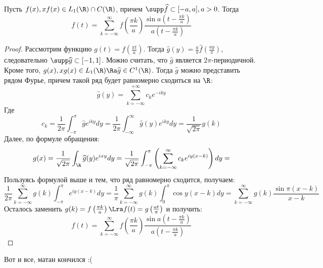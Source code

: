 \begin{theorem}[Котельникова]
    Пусть \(f(x), xf(x) \in L_1(\R) \cap C(\R)\), причем \(\supp \widehat{f} \subset [-a, a], a > 0\). Тогда
    \[f(t) = \sum_{k = -\infty}^{\infty} f\left( \frac{\pi k}{a} \right)\frac{\sin a\left( t - \frac{\pi k}{a} \right)}{a(t - \frac{\pi k}{a})}\]
\end{theorem}
\begin{proof}
    Рассмотрим функцию \(g(t) = f\left( \frac{\pi t}{a} \right)\). Тогда \(\widehat{g}(y) = \frac{a}{\pi}\widehat{f}\left( \frac{ay}{\pi} \right)\), следовательно \(\supp \widehat{g} \subset [-1, 1]\). Можно считать, что \(\widehat{g}\) является \(2\pi\)-периодичной. Кроме того, \(g(x), xg(x) \in L_1(\R) \Ra \widehat{g} \in C^1(\R)\). Тогда \(\widehat{g}\) можно представить рядом Фурье, причем такой ряд будет равномерно сходиться на \(\R\):
    \[\widehat{g}(y) = \sum_{k = -\infty}^{+\infty}c_ke^{-iky}\]
    Где
    \[c_k = \frac{1}{2\pi}\int_{-\pi}^{\pi}\widehat{g}e^{iky}dy = \frac{1}{2\pi}\int_{-\infty}^{\infty}\widehat{g}(y)e^{iky}dy = \frac{1}{\sqrt{2\pi}}g(k)\]
    Далее, по формуле обращения: 
    \[g(x) = \frac{1}{\sqrt{2\pi}}\int_\R \widehat{g}(y)e^{ixy}dy = \frac{1}{\sqrt{2\pi}}\int_{-\pi}^{\pi}\left( \sum_{k = -\infty}^\infty c_ke^{iy(x - k)} \right)dy = \]
    Пользуясь формулой выше и тем, что ряд равномерно сходится, получаем:
    \[\frac{1}{2\pi}\sum_{k = -\infty}^{\infty}g(k)\int_{-\pi}^\pi e^{iy(x - k)}dy = \frac{1}{\pi}\sum_{k = -\infty}^\infty g(k) \int_{0}^\pi \cos y(x - k)dy = \sum_{k = -\infty}^\infty g(k) \frac{\sin \pi(x - k)}{x - k}\]
    Осталось заменить \(g(k) = f\left( \frac{\pi k}{a} \right) \Lra f(t) = g\left( \frac{at}{\pi} \right)\) и получить:
    \[f(t) = \sum_{k = -\infty}^{\infty} f\left( \frac{\pi k}{a} \right)\frac{\sin a\left( t - \frac{\pi k}{a} \right)}{a(t - \frac{\pi k}{a})}\]
\end{proof}

Вот и все, матан кончился :(
